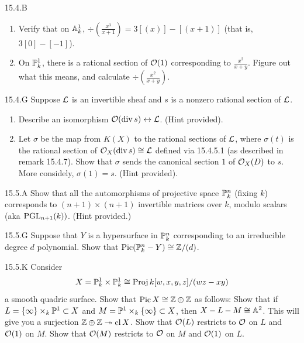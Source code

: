 \documentclass[12pt]{amsart}
\begin{document}


\begin{problem}{15.4.B}
    \begin{enumerate}
        \item Verify that on $\A^1_k$, $\div\left(\frac{x^3}{x+1}\right) = 3[(x)] - [(x+1)]$ (that is, $3[0] -[-1]$).
        \item On $\P^1_k$, there is a rational section of $\OO(1)$ corresponding to $\frac{x^2}{x+y}$. Figure out what this means, and calculate $\div\left(\frac{x^2}{x+y}\right)$. 
    \end{enumerate}
\end{problem}
\newpage

\begin{problem}{15.4.G}
    Suppose $\LL$ is an invertible sheaf and $s$ is a nonzero rational section of $\LL$. 
    \begin{enumerate}
        \item Describe an isomorphism $\OO(\div s) \leftrightarrow \LL$. (Hint provided). 
        \item Let $\sigma$ be the map from $K(X)$ to the rational sections of $\LL$, where $\sigma(t)$ is the rational section of $\OO_X(\div s) \cong \LL$ defined via 15.4.5.1 (as described in remark 15.4.7). Show that $\sigma$ sends the canonical section $1$ of $\OO_X(D)$ to $s$. More considely, $\sigma(1) = s$. (Hint provided).
    \end{enumerate}
\end{problem}
\newpage

\begin{problem}{15.5.A}
    Show that all the automorphisms of projective space $\P_k^n$ (fixing $k$) corresponds to $(n+1) \times (n+1)$ invertible matrices over $k$, modulo scalars (aka $\PGL_{n+1}(k))$. (Hint provided.)
\end{problem}
\newpage 

\begin{problem}{15.5.G}
    Suppose that $Y$ is a hypersurface in $\P^n_k$ corresponding to an irreducible degree $d$ polynomial. Show that $\Pic(\P^n_k - Y) \cong \Z/(d)$. 
\end{problem}
\newpage 

\begin{problem}{15.5.K}
    Consider 
    \begin{align*}
        X = \P_k^1 \times \P_k^1 \cong \Proj k[w,x,y,z]/(wz-xy)
    \end{align*}
    a smooth quadric surface. Show that $\Pic X \cong \Z \oplus \Z$ as follows: Show that if $L = \{\infty\} \times_k \P^1 \subset X$ and $M = \P^1 \times_k \{\infty\} \subset X$, then $X-L-M \cong \A^2$. This will give you a surjection $\Z \oplus \Z \twoheadrightarrow \cl X$. Show that $\OO(L)$ restricts to $\OO$ on $L$ and $\OO(1)$ on $M$. Show that $\OO(M)$ restricts to $\OO$ on $M$ and $\OO(1)$ on $L$. 
\end{problem}
\newpage 
\end{document}

